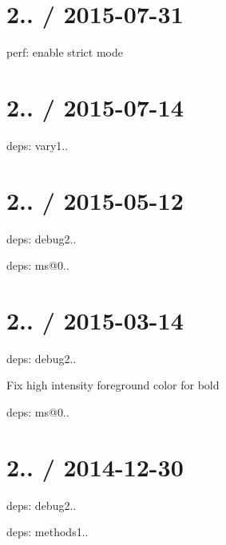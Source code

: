 \section*{2.. / 2015-\/07-\/31 }


\begin{DoxyItemize}
\item perf\+: enable strict mode
\end{DoxyItemize}

\section*{2.. / 2015-\/07-\/14 }


\begin{DoxyItemize}
\item deps\+: vary1..
\end{DoxyItemize}

\section*{2.. / 2015-\/05-\/12 }


\begin{DoxyItemize}
\item deps\+: debug2..
\begin{DoxyItemize}
\item deps\+: ms@0..
\end{DoxyItemize}
\end{DoxyItemize}

\section*{2.. / 2015-\/03-\/14 }


\begin{DoxyItemize}
\item deps\+: debug2..
\begin{DoxyItemize}
\item Fix high intensity foreground color for bold
\item deps\+: ms@0..
\end{DoxyItemize}
\end{DoxyItemize}

\section*{2.. / 2014-\/12-\/30 }


\begin{DoxyItemize}
\item deps\+: debug2..
\item deps\+: methods1..
\end{DoxyItemize}

